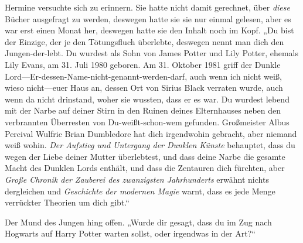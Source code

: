 Hermine versuchte sich zu erinnern. Sie hatte nicht damit gerechnet, über \emph{diese} Bücher ausgefragt zu werden, deswegen hatte sie sie nur einmal gelesen, aber es war erst einen Monat her, deswegen hatte sie den Inhalt noch im Kopf. „Du bist der Einzige, der je den Tötungsfluch überlebte, deswegen nennt man dich den Jungen-der-lebt. Du wurdest als Sohn von James Potter und Lily Potter, ehemals Lily Evans, am 31. Juli 1980 geboren. Am 31. Oktober 1981 griff der Dunkle Lord—Er-dessen-Name-nicht-genannt-werden-darf, auch wenn ich nicht weiß, wieso nicht—euer Haus an, dessen Ort von Sirius Black verraten wurde, auch wenn da nicht drinstand, woher sie wussten, dass er es war. Du wurdest lebend mit der Narbe auf deiner Stirn in den Ruinen deines Elternhauses neben den verbrannten Überresten von Du-weißt-schon-wem gefunden. Großmeister Albus Percival Wulfric Brian Dumbledore hat dich irgendwohin gebracht, aber niemand weiß wohin. \emph{Der Aufstieg und Untergang der Dunklen Künste} behauptet, dass du wegen der Liebe deiner Mutter überlebtest, und dass deine Narbe die gesamte Macht des Dunklen Lords enthält, und dass die Zentauren dich fürchten, aber \emph{Große Chronik der Zauberei des zwanzigsten Jahrhunderts} erwähnt nichts dergleichen und \emph{Geschichte der modernen Magie} warnt, dass es jede Menge verrückter Theorien um dich gibt.“

Der Mund des Jungen hing offen. „Wurde dir gesagt, dass du im Zug nach Hogwarts auf Harry Potter warten sollst, oder irgendwas in der Art?“

